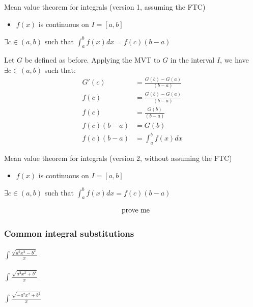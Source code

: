 \begin{property}{Mean value theorem for integrals (version 1, assuming the FTC)}
\begin{precondition}
\begin{itemize}
    \item $f(x)$ is continuous on $I=[a,b]$
\end{itemize}
\end{precondition}
\begin{claim}
    $∃c ∈ (a,b)$ such that $\int_a^b f(x) dx = f(c) (b-a)$
\end{claim}
\begin{Proof}
Let $G$ be defined as before. Applying the MVT to $G$ in the interval $I$, we have $∃c ∈ (a,b)$ such that:
\begin{align*}
G'(c) &= \frac{G(b)-G(a)}{(b-a)}
\\ f(c) &= \frac{G(b)-G(a)}{(b-a)}
\\ f(c) &= \frac{G(b)}{(b-a)}
\\ f(c) (b-a)  &=G(b)
\\ f(c) (b-a)  &=\int_a^b f(x) dx
\end{align*}

\end{Proof}
\end{property}


\begin{property}{Mean value theorem for integrals (version 2, without assuming the FTC)}
\begin{precondition}
\begin{itemize}
    \item $f(x)$ is continuous on $I=[a,b]$
\end{itemize}
\end{precondition}
\begin{claim}
    $∃c ∈ (a,b)$ such that $\int_a^b f(x) dx = f(c) (b-a)$
\end{claim}
\begin{Proof}
\begin{align*}
  \mathcomment{prove me}
\end{align*}
\end{Proof}
\end{property}

\subsubsection{Common integral substitutions}

\paragraph{$\int \frac{\sqrt{a^2 x^2-b^2}}{x} $}

\paragraph{$\int \frac{\sqrt{a^2 x^2+b^2}}{x} $}

\paragraph{$\int \frac{\sqrt{-a^2 x^2+b^2}}{x} $}
